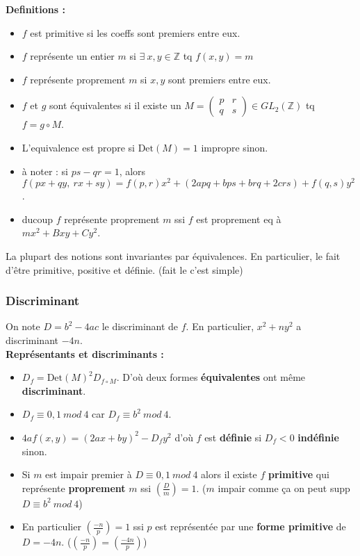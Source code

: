 \documentclass[12pt]{article}
\theoremstyle{plain}
\newcommand{\Z}{\mathbb{Z}}
\newcommand{\Det}{\textrm{Det}}
\newcommand{\gr}{\color{Sepia}}
\newcommand{\rg}{\color{Red}}
\begin{document}
\noindent \textbf{\rg Definitions : }
\begin{itemize}
    \item $f$ est primitive si les coeffs sont premiers entre eux.
    \item $f$ représente un entier $m$ si $\exists~x,y\in\Z$ tq $f(x,y)=m$
    \item $f$ représente proprement $m$ si $x,y$ sont premiers entre eux.
    \item $f$ et $g$ sont équivalentes si il existe un $M=\begin{pmatrix}
        p & r\\
        q & s
    \end{pmatrix}\in GL_2(\Z)$ tq $f=g\circ M$.
    \item L'equivalence est propre si $\Det(M)=1$ impropre sinon.
    \item à noter : si $ps-qr=1$, alors $f(px+qy,~rx+sy)=f(p,r)x^2+(2apq+bps+brq+2crs)+f(q,s)y^2$.
    \item ducoup $f$ représente proprement $m$ ssi $f$ est proprement eq à $mx^2+Bxy+Cy^2$.
\end{itemize}
La plupart des notions sont invariantes par équivalences. En particulier, le fait d'être primitive, positive et définie. (fait le c'est simple)

\subsubsection{Discriminant}
On note $D=b^2-4ac$ le discriminant de $f$. En particulier, $x^2+ny^2$ a discriminant $-4n$.\\

\noindent \textbf{\rg Représentants et discriminants :}
\begin{itemize}
    \item $D_f=\Det(M)^2D_{f\circ M}$. D'où deux formes \textbf{\gr équivalentes} ont même \textbf{\gr discriminant}.
    \item $D_f\equiv 0,1~mod~4$ car $D_f\equiv b^2~mod~4$.
    \item $4af(x,y)=(2ax+by)^2-D_fy^2$ d'où $f$ est \textbf{\gr définie} si $D_f<0$ \textbf{\gr indéfinie} sinon.
    \item Si $m$ est impair premier à $D\equiv0,1~mod~4$ alors il existe $f$ \textbf{\gr primitive} qui représente \textbf{\gr proprement} $m$ ssi $\left(\frac{D}{m}\right)=1$.
    ($m$ impair comme ça on peut supp $D\equiv b^2~mod~4$)
    \item En particulier $\left(\frac{-n}{p}\right)=1$ ssi $p$ est représentée par une \textbf{\gr forme primitive} de $D=-4n$. ($\left(\frac{-n}{p}\right)=\left(\frac{-4n}{p}\right)$)
\end{itemize}
\end{document}
